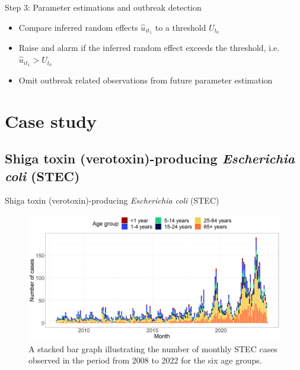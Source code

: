 \documentclass[aspectratio=169]{beamer}
\begin{document}
\begin{frame}{Step 3: Parameter estimations and outbreak detection}
\protect\hypertarget{step-3-parameter-estimations-and-outbreak-detection}{}
\begin{itemize}
  \item Compare inferred random effects $\hat u_{i{t_1}}$ to a threshold $U_{t_0}$
  \item Raise and alarm if the inferred random effect exceeds the threshold, i.e. $\hat u_{i{t_1}}>U_{t_0}$
  \item Omit outbreak related observations from future parameter estimation
\end{itemize}
\end{frame}

\hypertarget{case-study}{%
\section{Case study}\label{case-study}}

\hypertarget{shiga-toxin-verotoxin-producing-escherichia-coli-stec}{%
\subsection{\texorpdfstring{Shiga toxin (verotoxin)-producing
\emph{Escherichia coli}
(STEC)}{Shiga toxin (verotoxin)-producing Escherichia coli (STEC)}}\label{shiga-toxin-verotoxin-producing-escherichia-coli-stec}}

\begin{frame}{Shiga toxin (verotoxin)-producing \emph{Escherichia coli}
(STEC)}
\tiny

\begin{figure}[H]
\includegraphics[width=0.75\linewidth]{../figures/STEC_long_plot} \caption{A stacked bar graph illustrating the number of monthly STEC cases observed in the period from 2008 to 2022 for the six age groups.}\label{fig:STEC}
\end{figure}

\normalsize
\end{frame}
\end{document}
